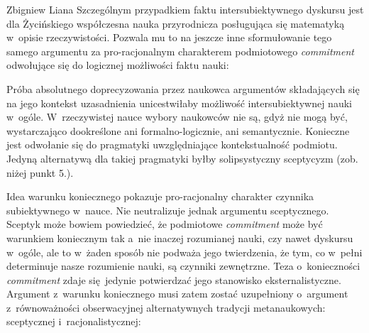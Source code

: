 \begin{artplenv}{Zbigniew Liana}
Szczególnym przypadkiem faktu intersubiektywnego dyskursu jest dla Życińskiego współczesna nauka przyrodnicza posługująca się matematyką w~opisie rzeczywistości. Pozwala mu to na jeszcze inne sformułowanie tego samego argumentu za pro-racjonalnym charakterem podmiotowego \textit{commitment} odwołujące się do logicznej możliwości faktu nauki:



Próba absolutnego doprecyzowania przez naukowca argumentów składających się na jego kontekst uzasadnienia unicestwiłaby możliwość intersubiektywnej nauki w~ogóle. W~rzeczywistej nauce wybory naukowców nie są, gdyż nie mogą być, wystarczająco dookreślone ani formalno-logicznie, ani semantycznie. Konieczne jest odwołanie się do pragmatyki uwzględniające kontekstualność podmiotu. Jedyną alternatywą dla takiej pragmatyki byłby solipsystyczny sceptycyzm (zob. niżej punkt 5.).

Idea warunku koniecznego pokazuje pro-racjonalny charakter czynnika subiektywnego w~nauce. Nie neutralizuje jednak argumentu sceptycznego. Sceptyk może bowiem powiedzieć, że podmiotowe \textit{commitment} może być warunkiem koniecznym tak a~nie inaczej rozumianej nauki, czy nawet dyskursu w~ogóle, ale to w~żaden sposób nie podważa jego twierdzenia, że tym, co w~pełni determinuje nasze rozumienie nauki, są czynniki zewnętrzne. Teza o~konieczności \textit{commitment} zdaje się~jedynie potwierdzać jego stanowisko eksternalistyczne. Argument z~warunku koniecznego musi zatem zostać uzupełniony o~argument z~równoważności obserwacyjnej alternatywnych tradycji metanaukowych: sceptycznej i~racjonalistycznej:




\end{artplenv}
